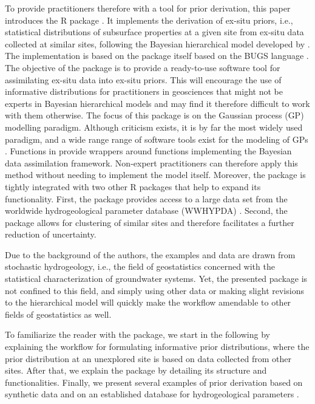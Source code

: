 To provide practitioners therefore with a tool for prior derivation, this paper introduces the R package  \citep{exPrior_zenodo}. 
It implements the derivation of ex-situ priors, i.e., statistical distributions of subsurface properties at a given site from ex-situ data collected at similar sites, following the Bayesian hierarchical model developed by \citet{Cucchi2019}. 
The implementation is based on the  package \citep{Valpine2017} itself based on the BUGS language \citep{Lunn2009}. 
The objective of the  package is to provide a ready-to-use software tool for assimilating ex-situ data into ex-situ priors. 
This will encourage the use of informative distributions for practitioners in geosciences that might not be experts in Bayesian hierarchical models and may find it therefore difficult to work with them otherwise. 
The focus of this package is on the Gaussian process (GP) modelling paradigm.
Although criticism exists, it is by far the most widely used paradigm, and a wide range range of software tools exist for the modeling of GPs \citep{Pebesma2004}.
Functions in  provide wrappers around  functions implementing the Bayesian data assimilation framework. 
Non-expert practitioners can therefore apply this method without needing to implement the model itself. 
Moreover, the package is tightly integrated with two other R packages that help to expand its functionality.
First, the  package \citep{geostatDB_zenodo} provides access to a large data set from the worldwide hydrogeological parameter database (WWHYPDA) \cite{Comunian2009}.
Second, the  package \citep{siteSimilarity_zenodo} allows for clustering of similar sites and therefore facilitates a further reduction of uncertainty. 

Due to the background of the authors, the examples and data are drawn from stochastic hydrogeology, i.e., the field of geostatistics concerned with the statistical characterization of groundwater systems. 
Yet, the presented package is not confined to this field, and simply using other data or making slight revisions to the hierarchical model will quickly make the workflow amendable to other fields of geostatistics as well. 

To familiarize the reader with the package, we start in the following by explaining the workflow for formulating informative prior distributions, where the prior distribution at an unexplored site is based on data collected from other sites.
After that, we explain the package by detailing its structure and functionalities.
Finally, we present several examples of prior derivation based on synthetic data and on an established database for hydrogeological parameters \citep{Comunian2009}.


